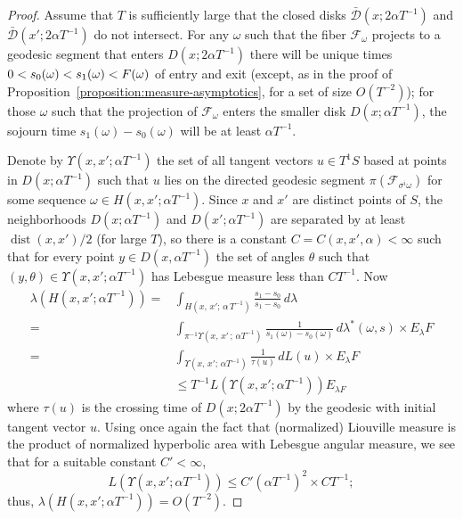 \documentclass[AHL, Unicode, longabstracts, published]{cedram}
\DeclareMathOperator{\dist}{dist}
\begin{document}
\begin{proof}
Assume that $T$ is sufficiently large that the closed disks $\bar{\mathcal{D}} (x;2\alpha T^{-1})$ and $\bar{\mathcal{D}} (x';2\alpha T^{-1})$ do not intersect. For any $\omega$ such that the fiber $\mathcal{F}_{\omega}$ projects to a geodesic segment that enters $D(x;2\alpha T^{-1})$ there will be unique times $0<s_{0} (\omega)\linebreak<s_{1} (\omega)<F (\omega)$ of entry and exit (except, as in the proof of Proposition~\ref{proposition:measure-asymptotics}, for a set of size $O(T^{-2})$); for those $\omega$ such that the projection of $\mathcal{F}_{\omega }$ enters the smaller disk $D(x;\alpha T^{-1})$, the sojourn time $s_{1} (\omega)-s_{0} (\omega)$ will be at least $\alpha T^{-1}$.

Denote by $\Upsilon (x,x';\alpha T^{-1})$ the set of all tangent vectors $u\in T^1S$ based at points in $D(x;\alpha T^{-1})$ such that $u$ lies on the directed geodesic segment $\pi (\mathcal{F}_{\sigma^{i}\omega})$ for some sequence $\omega \in H (x,x';\alpha T^{-1})$. Since $x$ and $x'$ are distinct points of $S$, the neighborhoods $D(x;\alpha T^{-1})$ and $D(x';\alpha T^{-1})$ are separated by at least $\dist (x,x')/2$ (for large $T$), so there is a constant $C=C (x,x',\alpha) <\infty$ such that for every point $y\in D(x,\alpha T^{-1})$ the set of angles $\theta$ such that $(y,\theta)\in \Upsilon (x,x';\alpha T^{-1})$ has Lebesgue measure less than $CT^{-1}$. Now
\begin{align*}
\lambda (H (x,x';\alpha T^{-1}))=&\int_{H (x,\,x';\,\alpha\, T^{-1})}
\frac{s_{1}-s_{0}}{s_{1}-s_{0}} \,d\lambda \\
=& \int_{\pi^{-1}\Upsilon (x,\,x'\,;\,\alpha T^{-1})} \frac{1}{s_{1} (\omega)-s_{0} (\omega)} \,d\lambda^{*} (\omega,s)\times E_{\lambda}F\\
=&\int_{\Upsilon (x,\,x';\,\alpha T^{-1})} \frac{1}{\tau (u)}
\,dL(u) \times E_{\lambda}F \\
&\leq T^{-1} L \left(\Upsilon \left(x,x';\alpha T^{-1}\right)\right)E_{\lambda F}
\end{align*}
where $\tau (u)$ is the crossing time of $D(x;2\alpha T^{-1})$ by the geodesic with initial tangent vector $u$. Using once again the fact that (normalized) Liouville measure is the product of normalized hyperbolic area with Lebesgue angular measure, we see that for a suitable constant $C'<\infty$,
\[
L \left(\Upsilon\left(x,x';\alpha T^{-1}\right)\right)\leq C' (\alpha T^{-1})^{2} \times CT^{-1};
\]
thus, $\lambda (H (x,x';\alpha T^{-1}))=O (T^{-2})$.
\end{proof}
\end{document}
